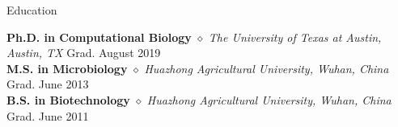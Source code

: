\documentclass{my_resume} %
\begin{document}
\vspace{-1mm}



\begin{rSection}{Education}

{\bf Ph.D. in Computational Biology} {$\diamond$} {\em The University of
Texas at Austin, Austin, TX} \hfill {Grad. August 2019} \\
{\bf M.S. in Microbiology} {$\diamond$} {\em Huazhong Agricultural University,
Wuhan, China} \hfill {Grad. June 2013} \\
{\bf B.S. in Biotechnology} {$\diamond$} {\em Huazhong Agricultural University,
Wuhan, China} \hfill {Grad. June 2011}
\end{rSection}

\end{document}
